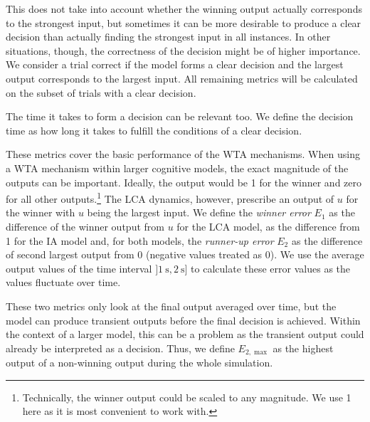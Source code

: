 \documentclass[10pt,letterpaper]{article}
\begin{document}
This does not take into account whether the winning output actually corresponds 
to the strongest input, but sometimes it can be more desirable to produce 
a clear decision than actually finding the strongest input in all instances. In 
other situations, though, the correctness of the decision might be of higher 
importance. We consider a trial correct if the model forms a clear decision and 
the largest output corresponds to the largest input. All remaining metrics will 
be calculated on the subset of trials with a clear decision.

The time it takes to form a decision can be relevant too.  We define the 
decision time as how long it takes to fulfill the conditions of a clear 
decision.

These metrics cover the basic performance of the WTA mechanisms. When using 
a WTA mechanism within larger cognitive models, the exact magnitude of the 
outputs can be important. Ideally, the output would be 1 for the winner and zero 
for all other outputs.\footnote{Technically, the winner output could be scaled 
    to any magnitude. We use 1 here as it is most convenient to work with.} The 
LCA dynamics, however, prescribe an output of $u$ for the winner with $u$ being 
the largest input. We define the \emph{winner error} $E_1$ as the difference of 
the winner output from $u$ for the LCA model, as the difference from 1 for the 
IA model and, for both models, the \emph{runner-up error} $E_2$ as the 
difference of second largest output from 
0 (negative values treated as 0). We use the average output values of the time 
  interval
 $]\SI{1}{\second}, \SI{2}{\second}]$ %
to calculate these error values as the values fluctuate over time.

These two metrics only look at the final output averaged over time, but the 
model can produce transient outputs before the final decision is achieved.  
Within the context of a larger model, this can be a problem as the transient 
output could already be interpreted as a decision. Thus, we define $E_{2,\max}$ 
as the highest output of a non-winning output during the whole simulation.
\end{document}
